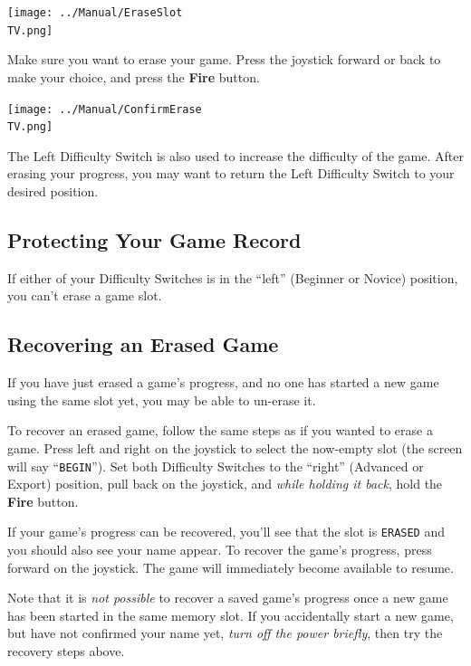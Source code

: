 \documentclass[10pt,twocolumn,openany,article]{memoir}
\newcommand\TV{NTSC}
\newcommand\TV{PAL}
\begin{document}
\begin{center}
  \texttt{[image: ../Manual/EraseSlot\\TV.png]}
\end{center}

Make sure  you want to  erase your game.  Press the joystick  forward or
back to make your choice, and press the \textbf{Fire} button.

\begin{center}
  \texttt{[image: ../Manual/ConfirmErase\\TV.png]}
\end{center}

The Left  Difficulty Switch is also  used to increase the  difficulty of
the game. After  erasing your progress, you may want  to return the Left
Difficulty Switch to your desired position.

\subsection{Protecting Your Game Record}

If either  of your Difficulty Switches  is in the ``left''  (Beginner or
Novice) position, you can't erase a game slot.

\subsection{Recovering an Erased Game}

If you have just erased a game's  progress, and no one has started a new
game using the same slot yet, you may be able to un-erase it.

To recover  an erased game,  follow the same steps  as if you  wanted to
erase  a game.  Press  left and  right  on the  joystick  to select  the
now-empty  slot  (the  screen  will say  ``\texttt{BEGIN}'').  Set  both
Difficulty Switches to the ``right'' (Advanced or Export) position, pull
back  on  the joystick,  and  \emph{while  holding  it back},  hold  the
\textbf{Fire} button.

If your  game's progress can be  recovered, you'll see that  the slot is
\texttt{ERASED} and you should also see your name appear. To recover the
game's progress, press forward on the joystick. The game will immediately
become available to resume.

Note that it  is \emph{not possible} to recover a  saved game's progress
once  a new  game has  been  started in  the  same memory  slot. If  you
accidentally start  a new game,  but have  not confirmed your  name yet,
\emph{turn off the power briefly}, then try the recovery steps above.
\end{document}

